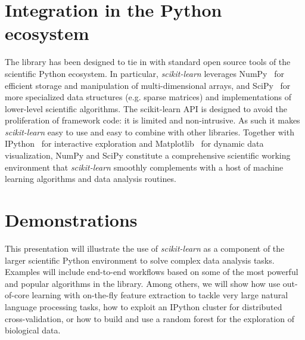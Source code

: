 \documentclass{article}
\newcommand{\sklearn}{\textit{scikit-learn}\xspace}
\DeclareRobustCommand{\VAN}[3]{#2}
\begin{document}
\section*{Integration in the Python ecosystem}

The library has been designed to tie in with standard  open source tools of the
scientific Python ecosystem. In particular, \sklearn leverages
NumPy~\citep{vanderwalt2011} for efficient storage and manipulation of
multi-dimensional arrays, and SciPy~\citep{oliphant2007python} for more specialized
data structures  (e.g. sparse matrices) and implementations of lower-level
scientific algorithms. The scikit-learn API is designed to avoid the
proliferation of framework code: it is
limited and non-intrusive. As such it makes \sklearn easy to use and easy to
combine with other libraries. Together with IPython~\citep{perez2007ipython}
for interactive exploration and Matplotlib~\citep{hunter2007matplotlib} for
dynamic data visualization, NumPy and SciPy constitute a comprehensive
scientific working environment that \sklearn smoothly complements with a
host of machine learning algorithms and data analysis routines.


\section*{Demonstrations}

This presentation will illustrate the use of \sklearn as a component of the
larger scientific Python environment to solve complex data analysis tasks.
Examples will include end-to-end workflows based on some of the most powerful
and popular algorithms in the library. Among others, we will show how use
out-of-core learning with on-the-fly feature extraction to 
tackle very large natural language processing tasks, how to
exploit an IPython cluster for distributed cross-validation, or how to build and
use a random forest for the exploration of biological data.


{\scriptsize

\DeclareRobustCommand{\VAN}[3]{#3}
\setlength{\bibsep}{1mm}

}
\end{document}
